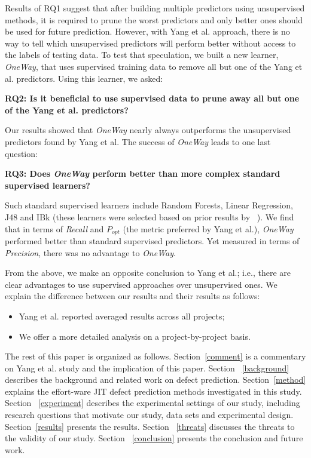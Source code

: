 \documentclass[sigconf]{acmart}
\theoremstyle{break}
\newcommand{\bi}{\begin{itemize}[leftmargin=0.4cm]}
\newcommand{\ei}{\end{itemize}}
\begin{document}
Results of RQ1 suggest that after  building multiple predictors using unsupervised methods,
it is required to prune the worst predictors and only better ones should be used for future prediction. However, with Yang et al. approach, there is no way to tell which unsupervised predictors will perform better without access to the labels of testing data. To test that speculation,
we built a new learner, {\it OneWay},  that  uses supervised training data to remove all but one of the Yang et al. predictors. Using this learner, we asked:

\textbf{RQ2: Is it beneficial to use supervised data to prune away all but one of the Yang et al. predictors?}

Our results showed that {\it OneWay} nearly always outperforms the unsupervised predictors found by Yang et al. The success of {\it OneWay} leads to one last question:


\textbf{RQ3: Does {\it OneWay} perform  better than more complex standard supervised learners?} 

	Such standard supervised learners include Random Forests, Linear Regression, J48 and IBk (these learners were selected based on prior results by ~\cite{menzies2007data,lessmann2008benchmarking,kamei2013large,hall2012systematic}).
We find that in terms 
of {\it Recall} and $P_{opt}$ (the metric preferred by Yang et al.), {\it OneWay} performed better than standard supervised predictors.  Yet measured in terms of
 {\it Precision}, there was no advantage to {\it OneWay}.

From the above, we make an opposite conclusion to Yang et al.; i.e.,
there are  clear advantages to use supervised approaches over unsupervised ones.
We explain the difference between our results and their results as follows:
\bi
\item Yang et al. reported averaged results across all projects;
\item We offer a more detailed analysis on a project-by-project basis.
\ei
The rest of this paper is organized as follows. Section~\ref{comment} is a commentary on Yang et al. study and the implication of this paper. Section ~\ref{background} describes the background and related work on defect prediction.
Section~\ref{method} explains the effort-ware JIT defect prediction methods investigated in this study. Section ~\ref{experiment} describes the
experimental settings of our study, including research questions that motivate our study, data sets and experimental design.
Section~\ref{results} presents the results. Section ~\ref{threats} discusses the threats to the validity of our study.  Section ~\ref{conclusion} presents the conclusion and future work.
\end{document}
